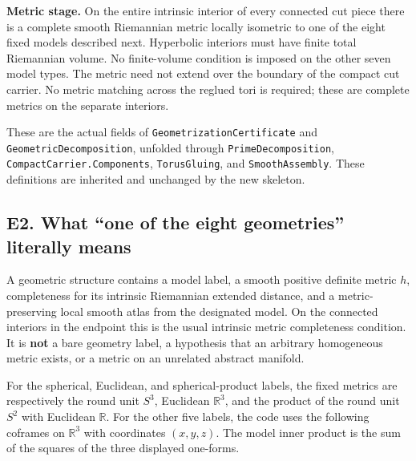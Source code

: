 \documentclass[
  letterpaper,
  11pt]{article}
\begin{document}
\textbf{Metric stage.} On the entire intrinsic interior of every
connected cut piece there is a complete smooth Riemannian metric locally
isometric to one of the eight fixed models described next. Hyperbolic
interiors must have finite total Riemannian volume. No finite-volume
condition is imposed on the other seven model types. The metric need not
extend over the boundary of the compact cut carrier. No metric matching
across the reglued tori is required; these are complete metrics on the
separate interiors.

These are the actual fields of
{\small\texttt{Geometrization\allowbreak{}Certificate}} and
{\small\texttt{Geometric\allowbreak{}Decomposition}}, unfolded through
{\small\texttt{Prime\allowbreak{}Decomposition}},
{\small\texttt{Compact\allowbreak{}Carrier.\allowbreak{}Components}},
{\small\texttt{Torus\allowbreak{}Gluing}}, and
{\small\texttt{Smooth\allowbreak{}Assembly}}. These definitions are
inherited and unchanged by the new skeleton.

\subsection{E2. What ``one of the eight geometries'' literally
means}\label{e2-models}

A geometric structure contains a model label, a smooth positive definite
metric \(h\), completeness for its intrinsic Riemannian extended
distance, and a metric-preserving local smooth atlas from the designated
model. On the connected interiors in the endpoint this is the usual
intrinsic metric completeness condition. It is \textbf{not} a bare
geometry label, a hypothesis that an arbitrary homogeneous metric
exists, or a metric on an unrelated abstract manifold.

For the spherical, Euclidean, and spherical-product labels, the fixed
metrics are respectively the round unit \(S^3\), Euclidean
\(\mathbb R^3\), and the product of the round unit \(S^2\) with
Euclidean \(\mathbb R\). For the other five labels, the code uses the
following coframes on \(\mathbb R^3\) with coordinates \((x,y,z)\). The
model inner product is the sum of the squares of the three displayed
one-forms.
\end{document}
